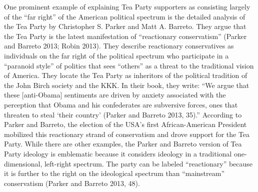 \documentclass[12pt,]{article}
\begin{document}
One prominent example of explaining Tea Party supporters as consisting
largely of the ``far right'' of the American political spectrum is the
detailed analysis of the Tea Party by Christopher S. Parker and Matt A.
Barreto. They argue that the Tea Party is the latest manifestation of
``reactionary conservatism'' (Parker and Barreto 2013; Robin 2013). They
describe reactionary conservatives as individuals on the far right of
the political spectrum who participate in a ``paranoid style'' of
politics that sees ``others'' as a threat to the traditional vision of
America. They locate the Tea Party as inheritors of the political
tradition of the John Birch society and the KKK. In their book, they
write: ``We argue that these {[}anti-Obama{]} sentiments are driven by
anxiety associated with the perception that Obama and his confederates
are subversive forces, ones that threaten to steal `their
country' (Parker and Barreto 2013, 35).'' According to Parker and
Barreto, the election of the USA's first African-American President
mobilized this reactionary strand of conservatism and drove support for
the Tea Party. While there are other examples, the Parker and Barreto
version of Tea Party ideology is emblematic because it considers
ideology in a traditional one-dimensional, left-right spectrum. The
party can be labeled ``reactionary'' because it is further to the right
on the ideological spectrum than ``mainstream'' conservatism (Parker and
Barreto 2013, 48).
\end{document}
